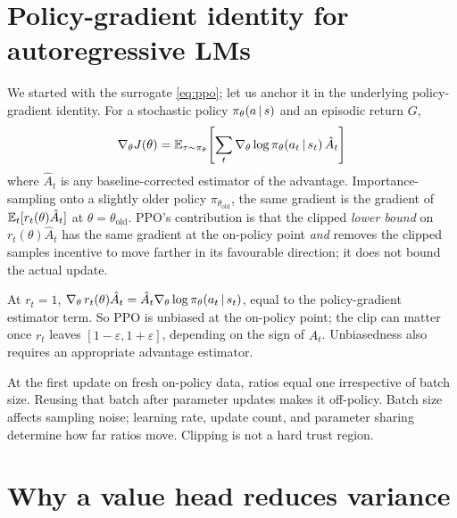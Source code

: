\documentclass[11pt,oneside]{scrbook}
\begin{document}
\section{Policy-gradient identity for autoregressive LMs}

We started with the surrogate \eqref{eq:ppo}; let us anchor it in the
underlying policy-gradient identity. For a stochastic policy
$\pi_\theta(a \,\vert\, s)$ and an episodic return $G$,
\[
\nabla_\theta J(\theta)
  = \mathbb{E}_{\tau \sim \pi_\theta}\!\left[\sum_t \nabla_\theta \log\pi_\theta(a_t \,\vert\, s_t)\, \hat A_t\right]
\]
where $\hat A_t$ is any baseline-corrected estimator of the advantage.
Importance-sampling onto a slightly older policy
$\pi_{\theta_{\text{old}}}$, the same gradient is the gradient of
$\mathbb{E}_t[r_t(\theta) \hat A_t]$ at $\theta = \theta_{\text{old}}$.
PPO's contribution is that the clipped \emph{lower bound} on
$r_t(\theta) \hat A_t$ has the same gradient at the on-policy point
\emph{and} removes the clipped sample\textquotesingle s incentive to move farther in its favourable direction; it does not bound the actual update.

\begin{lemma}[Local gradient equivalence at $\theta = \theta_{\text{old}}$]
\label{lem:local}
At $r_t = 1$, $\nabla_\theta\, r_t(\theta) \hat A_t
= \hat A_t \nabla_\theta \log\pi_\theta(a_t \,\vert\, s_t)$, equal to the
policy-gradient estimator term. So PPO is unbiased at the on-policy
point; the clip can matter once $r_t$ leaves $[1-\varepsilon,1+\varepsilon]$, depending on the sign of $\hat A_t$. Unbiasedness also requires an appropriate advantage estimator.
\end{lemma}

\begin{remark}
At the first update on fresh on-policy data, ratios equal one irrespective
of batch size. Reusing that batch after parameter updates makes it off-policy.
Batch size affects sampling noise; learning rate, update count, and parameter
sharing determine how far ratios move. Clipping is not a hard trust region.
\end{remark}

\section{Why a value head reduces variance}
\end{document}
